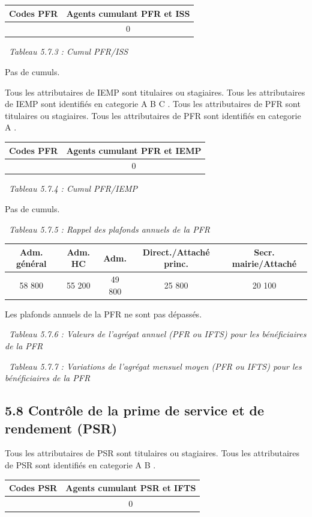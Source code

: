 \begin{longtable}[]{@{}cc@{}}
\toprule
Codes PFR & Agents cumulant PFR et ISS\tabularnewline
\midrule
\endhead
& 0\tabularnewline
\bottomrule
\end{longtable}

~\emph{Tableau 5.7.3 : Cumul PFR/ISS}

Pas de cumuls.

Tous les attributaires de IEMP sont titulaires ou stagiaires. Tous les
attributaires de IEMP sont identifiés en categorie A B C . Tous les
attributaires de PFR sont titulaires ou stagiaires. Tous les
attributaires de PFR sont identifiés en categorie A .

\begin{longtable}[]{@{}cc@{}}
\toprule
Codes PFR & Agents cumulant PFR et IEMP\tabularnewline
\midrule
\endhead
& 0\tabularnewline
\bottomrule
\end{longtable}

~\emph{Tableau 5.7.4 : Cumul PFR/IEMP}

Pas de cumuls.

~\emph{Tableau 5.7.5 : Rappel des plafonds annuels de la PFR}

\begin{longtable}[]{@{}ccccc@{}}
\toprule
Adm. général & Adm. HC & Adm. & Direct./Attaché princ. & Secr.
mairie/Attaché\tabularnewline
\midrule
\endhead
58 800 & 55 200 & 49 800 & 25 800 & 20 100\tabularnewline
\bottomrule
\end{longtable}

Les plafonds annuels de la PFR ne sont pas dépassés.

~\emph{Tableau 5.7.6 : Valeurs de l'agrégat annuel (PFR ou IFTS) pour
les bénéficiaires de la PFR}

~\emph{Tableau 5.7.7 : Variations de l'agrégat mensuel moyen (PFR ou
IFTS) pour les bénéficiaires de la PFR}

\hypertarget{controle-de-la-prime-de-service-et-de-rendement-psr}{%
\subsection{5.8 Contrôle de la prime de service et de rendement
(PSR)}\label{controle-de-la-prime-de-service-et-de-rendement-psr}}

Tous les attributaires de PSR sont titulaires ou stagiaires. Tous les
attributaires de PSR sont identifiés en categorie A B .

\begin{longtable}[]{@{}cc@{}}
\toprule
Codes PSR & Agents cumulant PSR et IFTS\tabularnewline
\midrule
\endhead
& 0\tabularnewline
\bottomrule
\end{longtable}

